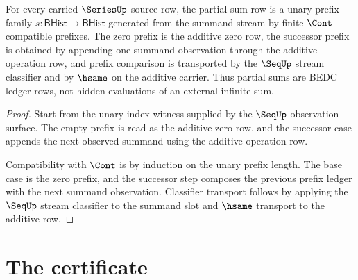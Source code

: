\begin{theorem}
\label{thm:series-partial-sum-obligation}
For every carried $\SeriesUp$ source row, the partial-sum row is a unary prefix family $s:\mathsf{BHist}\to\mathsf{BHist}$ generated from the summand stream by finite $\Cont$-compatible prefixes. The zero prefix is the additive zero row, the successor prefix is obtained by appending one summand observation through the additive operation row, and prefix comparison is transported by the $\SeqUp$ stream classifier and by $\hsame$ on the additive carrier. Thus partial sums are BEDC ledger rows, not hidden evaluations of an external infinite sum.
\end{theorem}
\begin{proof}
Start from the unary index witness supplied by the $\SeqUp$ observation surface. The empty prefix is read as the additive zero row, and the successor case appends the next observed summand using the additive operation row.

Compatibility with $\Cont$ is by induction on the unary prefix length. The base case is the zero prefix, and the successor step composes the previous prefix ledger with the next summand observation. Classifier transport follows by applying the $\SeqUp$ stream classifier to the summand slot and $\hsame$ transport to the additive row.
\end{proof}

\section{The certificate}
\label{sec:series-certificate}

